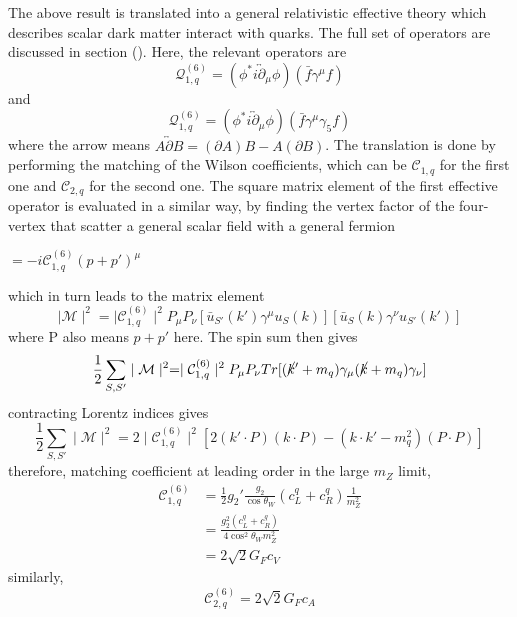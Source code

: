 \documentclass[12pt]{article}
\begin{document}
The above result is translated into a general relativistic effective theory which describes scalar dark matter interact with quarks. The full set of operators are discussed in section (). Here, the relevant operators are
$$
\mathcal Q_{1,q}^{(6)} = (\phi^* i \overleftrightarrow\partial_\mu \phi ) ( \bar f \gamma^\mu f ) 
$$
and 
$$
\mathcal Q_{1,q}^{(6)} = (\phi^* i \overleftrightarrow\partial_\mu \phi ) ( \bar f \gamma^\mu\gamma_5 f ) 
$$
where the arrow means $A \overleftrightarrow\partial B= (\partial A)B-A(\partial B)$. The translation is done by performing the matching of the Wilson coefficients, which can be $ \mathcal  C_{1,q}$ for the first one and $\mathcal  C_{2,q}$  for the second one. 
The square matrix element of the first effective operator is evaluated in a similar way, by finding the vertex factor of the four-vertex that scatter a general scalar field with a general fermion
\begin{center}
$= -i  \mathcal C^{(6)}_{1,q} (p+p')^\mu$
\end{center}
which in turn leads to the matrix element
 $$
\mid \mathcal  M \mid^2 = \mid \mathcal  C_{1,q}^{(6)}  \mid^2 P_\mu P_\nu  [\bar u_{S'}(k')   \gamma^\mu  u_S(k)] [\bar u_{S}(k)   \gamma^\nu   u_{S'}(k')]
$$
where P also means $p+p'$ here. The spin sum then gives
$$
\frac{1}{2}\sum_{S,S'} \mid \mathcal M \mid ^2 = 
 \mid \mathcal  C_{1,q}^{(6)}  \mid^2 P_\mu P_\nu Tr[(\cancel k'+m_q)  \gamma_\mu (\cancel k+m_q) \gamma_\nu]
$$
contracting Lorentz indices gives
$$
\frac{1}{2}\sum_{S,S'} \mid \mathcal M \mid ^2 =
2 \mid \mathcal  C_{1,q}^{(6)}  \mid^2 [ 2(k' \cdot P)(k \cdot P)-( k \cdot k' - m_q^2)(P \cdot P )]
$$
therefore, matching coefficient at leading order in the large $m_Z$ limit, 
\begin{equation}
\begin{aligned}
   \mathcal  C_{1,q}^{(6)} 
 &
=   \frac{1}{2} g_2' \frac{g_2}{\cos \theta_W}( c_L^{q}+c_R^{q}) \frac{1}{m_Z^2}\\
& = \frac{g_2^2 ( c_L^{q}+c_R^{q}) }{4\cos^2\theta_Wm_Z^2}\\
&= 2\sqrt 2 G_F c_V
 \end{aligned}
 \end{equation}
 similarly, 
 $$
 \mathcal  C_{2,q}^{(6)}  = 2\sqrt 2 G_F c_A
$$
\end{document}
